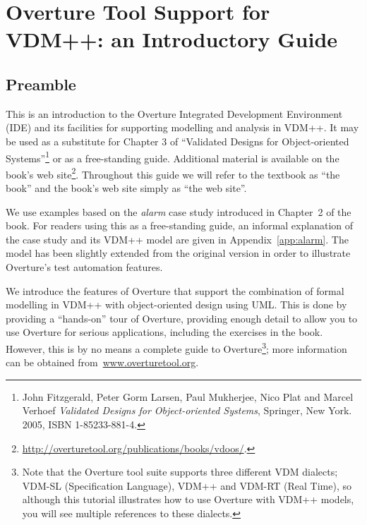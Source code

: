 \chapter{Overture Tool Support for VDM++: an Introductory Guide}\label{cha:toolbox}
\initexercise

\section*{Preamble}

This is an introduction to the Overture Integrated Development Environment (IDE) and its facilities for supporting modelling and analysis in VDM++. It may be used as a substitute for Chapter 3 of ``Validated Designs for Object-oriented Systems''\footnote{John Fitzgerald, Peter Gorm Larsen, Paul Mukherjee, Nico Plat and Marcel Verhoef \emph{Validated Designs for Object-oriented Systems}, Springer, New York. 2005, ISBN 1-85233-881-4.} or as a free-standing guide. Additional material is available on the book's web site\footnote{\url{http://overturetool.org/publications/books/vdoos/}.}. Throughout this guide we will refer to the textbook as ``the book'' and the book's web site simply as ``the web site''.

We use examples based on the \emph{alarm} case study introduced in Chapter~2 of the book. For readers using this as a free-standing guide, an informal explanation of the case study and its VDM++ model are given in Appendix~\ref{app:alarm}. The model has been slightly extended from the original version in order to illustrate Overture's test automation features.

We introduce the features of Overture that support the combination of formal modelling in VDM++ with object-oriented design using UML. This is done by providing a ``hands-on'' tour of Overture, providing enough detail to allow you to use Overture for serious applications, including the exercises in the book. However, this is by no means a complete guide to Overture\footnote{Note that the Overture tool suite supports three different VDM dialects; VDM-SL (Specification Language), VDM++ and VDM-RT (Real Time), so although this tutorial illustrates how to use Overture with VDM++ models, you will see multiple references to these dialects.}; more information can be obtained from~\url{www.overturetool.org}.
%
